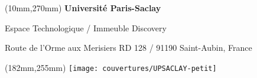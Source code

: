 \begin{textblock*}{161mm}(10mm,270mm)
\color{bordeau}
{\bf\noindent Université Paris-Saclay	         }

\noindent Espace Technologique / Immeuble Discovery

\noindent Route de l’Orme aux Merisiers RD 128 / 91190 Saint-Aubin, France
\end{textblock*}

\begin{textblock*}{20mm}(182mm,255mm)
\texttt{[image: couvertures/UPSACLAY-petit]}
\end{textblock*}

